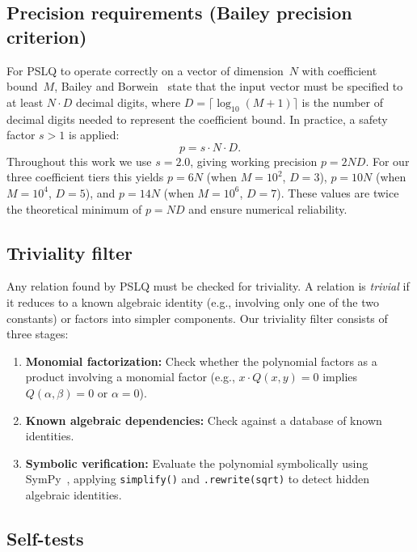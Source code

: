 \documentclass[11pt]{amsart}
\theoremstyle{remark}
\begin{document}
\subsection{Precision requirements (Bailey precision criterion)}%
\label{ssec:precision}

For PSLQ to operate correctly on a vector of dimension~$N$ with coefficient
bound~$M$, Bailey and Borwein~\cite{BaileyBorwein2013} state that the input vector
must be specified to at least $N\cdot D$ decimal digits, where
$D=\lceil\log_{10}(M+1)\rceil$ is the number of decimal digits needed to represent
the coefficient bound. In practice, a safety factor $s>1$ is applied:
\begin{equation}\label{eq:precision}
  p = s \cdot N \cdot D.
\end{equation}
Throughout this work we use $s=2.0$, giving working precision $p=2ND$. For our three
coefficient tiers this yields $p=6N$ (when $M=10^2$, $D=3$), $p=10N$ (when
$M=10^4$, $D=5$), and $p=14N$ (when $M=10^6$, $D=7$). These values are twice the
theoretical minimum of $p=ND$ and ensure numerical reliability.

\subsection{Triviality filter}\label{ssec:triviality}

Any relation found by PSLQ must be checked for triviality. A relation is
\emph{trivial} if it reduces to a known algebraic identity (e.g., involving only one
of the two constants) or factors into simpler components. Our triviality filter
consists of three stages:
\begin{enumerate}
\item \textbf{Monomial factorization:} Check whether the polynomial factors as a
  product involving a monomial factor (e.g., $x\cdot Q(x,y)=0$ implies
  $Q(\alpha,\beta)=0$ or $\alpha=0$).
\item \textbf{Known algebraic dependencies:} Check against a database of known
  identities.
\item \textbf{Symbolic verification:} Evaluate the polynomial symbolically using
  SymPy~\cite{SymPy2017}, applying \texttt{simplify()} and \texttt{.rewrite(sqrt)}
  to detect hidden algebraic identities.
\end{enumerate}

\subsection{Self-tests}\label{ssec:selftests}
\end{document}
